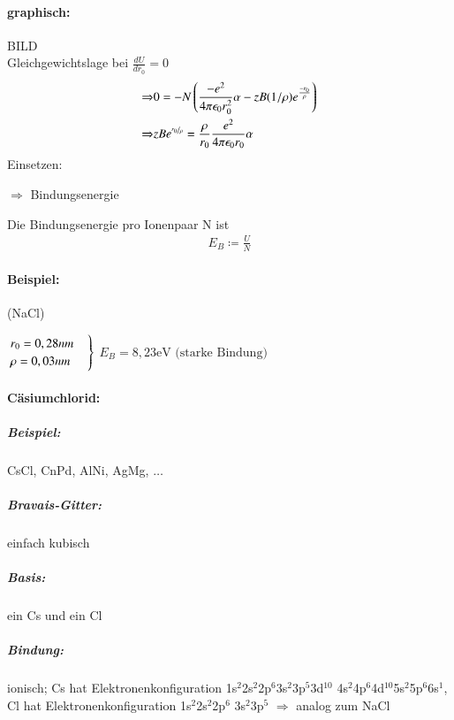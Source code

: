 \documentclass[paper=A4,12pt,pagesize,twoside,BCOR=8mm,ngerman]{scrartcl}
\newenvironment{rcases}{%
  \left.\renewcommand*\lbrace.%
  \begin{cases}}%
{\end{cases}\right\rbrace}
\begin{document}
				\paragraph*{graphisch:}
				BILD\\
				
				Gleichgewichtslage bei $\frac{dU}{dr_{0}}=0$
				\begin{align*}
					\Rightarrow & 0 = -N \left( \frac{-e^{2}}{4\pi{}
					\epsilon_{0} r_{0}^{2}}\alpha - zB(1/\rho)e^{
					\frac{-r_{0}}{\rho}} \right) \\
					\Rightarrow & z B e^{\nicefrac{r_{0}}{\rho}} = 
					\frac{\rho}{r_{0}} \frac{e^{2}}{4\pi\epsilon_{0} 
					r_{0}} \alpha
				\end{align*}
				Einsetzen:
				\begin{center}
					$\Rightarrow$  Bindungsenergie
				\end{center}
				Die Bindungsenergie pro Ionenpaar N ist 
				\begin{align*}
					E_{B} \coloneqq \frac{U}{N}
				\end{align*}
				\paragraph*{Beispiel:} (NaCl)
				\begin{center}
					$\begin{rcases}
						r_{0} = 0,28nm\\
						\rho = 0,03nm
				\end{rcases}$
				$E_{B} = 8,23\text{eV (starke Bindung)}$\\		
				\end{center}	
			\paragraph*{Cäsiumchlorid:}
				\subparagraph*{Beispiel:} CsCl, CnPd, AlNi, AgMg, 
				$\ldots$
				\subparagraph*{Bravais-Gitter:} einfach kubisch
				\subparagraph*{Basis:} ein Cs und ein Cl
				\subparagraph*{Bindung:} ionisch; Cs hat 
				Elektronenkonfiguration 
				1s$^{2}$2s$^{2}$2p$^{6}$3s$^{2}$3p$^{5}$3d$^{10}$
				4s$^{2}$4p$^{6}$4d$^{10}$5s$^{2}$5p$^{6}$6s$^{1}$,	Cl 
				hat Elektronenkonfiguration 1s$^{2}$2s$^{2}$2p$^{6}$
				3s$^{2}$3p$^{5}$ $\Rightarrow$ analog zum NaCl
				
				
\end{document}
